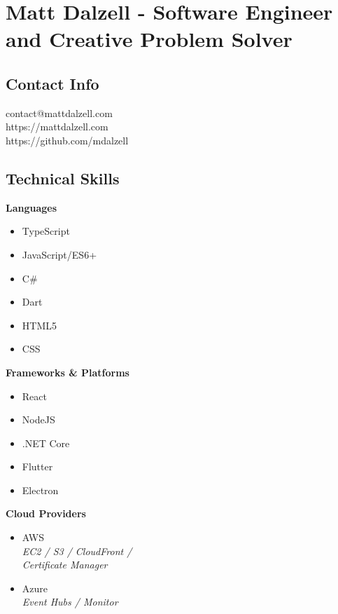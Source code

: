 \documentclass[10pt]{article}
\begin{document}

\section*{Matt Dalzell - {\large Software Engineer and Creative Problem Solver}}

\setlength{\columnsep}{4em}
\setlength{\columnseprule}{0.1pt}
\begin{paracol}{2}

    \subsection*{Contact Info}
    contact@mattdalzell.com \\
    https://mattdalzell.com \\
    https://github.com/mdalzell

    \subsection*{Technical Skills}

    \textbf{Languages}
    \begin{itemize}
        \item TypeScript
        \item JavaScript/ES6+
        \item C\#
        \item Dart
        \item HTML5
        \item CSS
    \end{itemize}

    \noindent \textbf{Frameworks \& Platforms}
    \begin{itemize}
        \item React
        \item NodeJS
        \item .NET Core
        \item Flutter
        \item Electron
    \end{itemize}

    \noindent \textbf{Cloud Providers}
    \begin{itemize}
        \item AWS  \\ {\footnotesize{\textit{EC2 / S3 / CloudFront / \\ Certificate Manager}}}
        \item Azure \\ {\footnotesize{\textit{Event Hubs / Monitor}}}
    \end{itemize}


\end{paracol}
\end{document}
